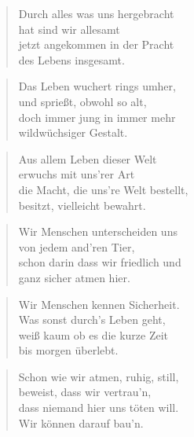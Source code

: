 \documentclass[10pt,a4paper]{article}
\begin{document}
\begin{multicols}{2}
\begin{verse}
Durch alles was uns hergebracht \\
hat sind wir allesamt \\
jetzt angekommen in der Pracht \\
des Lebens insgesamt. \\
\end{verse}

\begin{verse}
Das Leben wuchert rings umher, \\
und sprießt, obwohl so alt, \\
doch immer jung in immer mehr \\
wildwüchsiger Gestalt. \\
\end{verse}

\begin{verse}
Aus allem Leben dieser Welt \\
erwuchs mit uns’rer Art \\
die Macht, die uns’re Welt bestellt, \\
besitzt, vielleicht bewahrt. \\
\end{verse}

\begin{verse}
Wir Menschen unterscheiden uns \\
von jedem and’ren Tier, \\
schon darin dass wir friedlich und \\
ganz sicher atmen hier. \\
\end{verse}

\begin{verse}
Wir Menschen kennen Sicherheit. \\
Was sonst durch’s Leben geht, \\
weiß kaum ob es die kurze Zeit \\
bis morgen überlebt. \\
\end{verse}

\begin{verse}
Schon wie wir atmen, ruhig, still, \\
beweist, dass wir vertrau’n, \\
dass niemand hier uns töten will. \\
Wir können darauf bau’n. \\
\end{verse}


\end{multicols}
\end{document}
